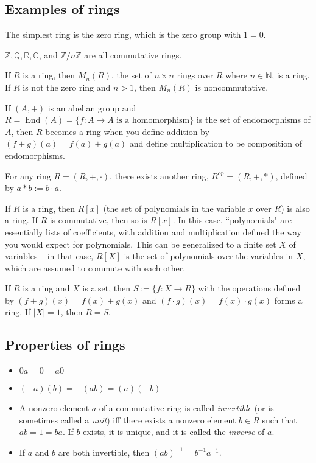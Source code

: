 \documentclass[12pt]{article}
\begin{document}
\subsection{Examples of rings}
The simplest ring is the zero ring, which is the zero group with $1=0$.
\par
$ \mathbb{Z}, \mathbb{Q}, \mathbb{R}, \mathbb{C}$, and $ \mathbb{Z}/n \mathbb{Z}$ are all commutative rings.
\par
If $R$ is a ring, then $M_n(R)$, the set of $n \times n$ rings over $R$ where $n \in \mathbb{N}$, is a ring. If $R$ is not the zero ring and $n>1$, then $M_n(R)$ is noncommutative.
\par
If $(A,+)$ is an abelian group and $R=\operatorname{End}(A)=\{f:A \rightarrow A \text{ is a homomorphism}\}$ is the set of endomorphisms of $A$, then $R$ becomes a ring when you define addition by $(f+g)(a)=f(a)+g(a)$ and define multiplication to be composition of endomorphisms.
\par
For any ring $R = (R,+,\cdot)$, there exists another ring, $R^{op}=(R,+,*)$, defined by $a*b:=b \cdot a$.
\par
If $R$ is a ring, then $R[x]$ (the set of polynomials in the variable $x$ over $R$) is also a ring. If $R$ is commutative, then so is $R[x]$. In this case, ``polynomials" are essentially lists of coefficients, with addition and multiplication defined the way you would expect for polynomials. This can be generalized to a finite set $X$ of variables -- in that case, $R[X]$ is the set of polynomials over the variables in $X$, which are assumed to commute with each other.
\par
If $R$ is a ring and $X$ is a set, then $S:=\{f:X \rightarrow R\}$ with the operations defined by $(f+g)(x)=f(x)+g(x)$ and $(f \cdot g)(x) = f(x) \cdot g(x)$ forms a ring. If $|X|=1$, then $R=S$.

\subsection{Properties of rings}
\begin{itemize}
    \item $0a=0=a0$
    \item $(-a)(b)=-(ab)=(a)(-b)$
    \item A nonzero element $a$ of a commutative ring is called \textit{invertible} (or is sometimes called a \textit{unit}) iff there exists a nonzero element $b \in R$ such that $ab=1=ba$. If $b$ exists, it is unique, and it is called the \textit{inverse} of $a$.
    \item If $a$ and $b$ are both invertible, then $(ab)^{-1} = b^{-1}a^{-1}$.
\end{itemize}
\end{document}
